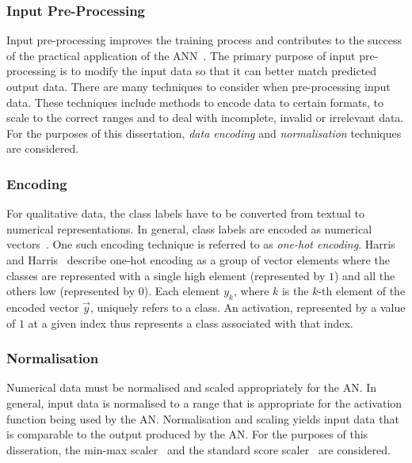 \subsubsection{Input Pre-Processing}\label{sec:anns:an:input:input_pre_processing}

Input pre-processing improves the training process and contributes to the success of the practical application of the \acs{ANN}~\cite{ref:kuzniar:2017}. The primary purpose of input pre-processing is to modify the input data so that it can better match predicted output data. There are many techniques to consider when pre-processing input data. These techniques include methods to encode data to certain formats, to scale to the correct ranges and to deal with incomplete, invalid or irrelevant data. For the purposes of this dissertation, \textit{data encoding} and \textit{normalisation} techniques are considered.


\subsubsection{Encoding}\label{sec:anns:an:input:encoding}

For qualitative data, the class labels have to be converted from textual to numerical representations. In general, class labels are encoded as numerical vectors~\cite{ref:srinidhi:2018, ref:brownlee:2017:one-hot}. One such encoding technique is referred to as \textit{one-hot encoding}. Harris and Harris~\cite{ref:harris:2010} describe one-hot encoding as a group of vector elements where the classes are represented with a single high element (represented by $1$) and all the others low (represented by $0$). Each element $y_k$, where $k$ is the $k$-th element of the encoded vector $\vec{y}$, uniquely refers to a class. An activation, represented by a value of $1$ at a given index thus represents a class associated with that index.

\subsubsection{Normalisation}\label{sec:anns:an:input:normalisation}

Numerical data must be normalised and scaled appropriately for the \acs{AN}. In general, input data is normalised to a range that is appropriate for the activation function being used by the \acs{AN}. Normalisation and scaling yields input data that is comparable to the output produced by the \acs{AN}. For the purposes of this disseration, the min-max scaler~\cite{ref:al:2006} and the standard score scaler~\cite{ref:jain:2005} are considered.

